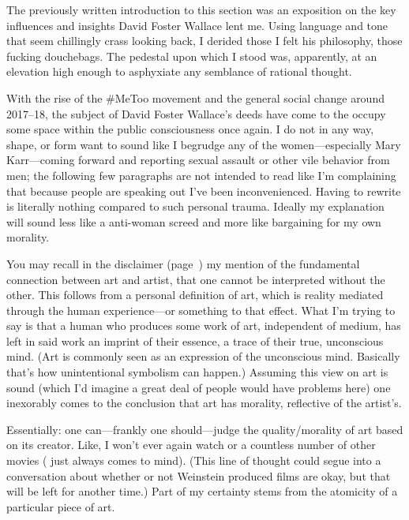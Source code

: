 \documentclass[./butidigress.tex]{subfiles}
\begin{document}

\label{sec:influences}
The previously written introduction to this section was an exposition on the key influences and insights David Foster Wallace lent me.
Using language and tone that seem chillingly crass looking back, I derided those I felt  his philosophy, those fucking douchebags.
The pedestal upon which I stood was, apparently, at an elevation high enough to asphyxiate any semblance of rational thought.

With the rise of the \#MeToo movement and the general social change around 2017--18, the subject of David Foster Wallace's deeds have come to the occupy some space within the public consciousness once again.
I do not in any way, shape, or form want to sound like I begrudge any of the women---especially Mary Karr---coming forward and reporting sexual assault or other vile behavior from men; the following few paragraphs are not intended to read like I'm complaining that because people are speaking out I've been inconvenienced.
Having to rewrite is literally nothing compared to such personal trauma.
Ideally my explanation will sound less like a anti-woman screed and more like bargaining for my own morality.

You may recall in the disclaimer (page~\pageref{chap:disclaimer}) my mention of the fundamental connection between art and artist, that one cannot be interpreted without the other.
This follows from a personal definition of art, which is reality mediated through the human experience---or something to that effect.
What I'm trying to say is that a human who produces some work of art, independent of medium, has left in said work an imprint of their essence, a trace of their true, unconscious mind.
(Art is commonly seen as an expression of the unconscious mind.
Basically that's how unintentional symbolism can happen.)
Assuming this view on art is sound (which I'd imagine a great deal of people would have problems here) one inexorably comes to the conclusion that art has morality, reflective of the artist's.

Essentially: one can---frankly one should---judge the quality/morality of art based on its creator.
Like, I won't ever again watch  or a countless number of other movies ( just always comes to mind).
(This line of thought could segue into a conversation about whether or not Weinstein produced films are okay, but that will be left for another time.)
Part of my certainty stems from the atomicity of a particular piece of art.
\end{document}
